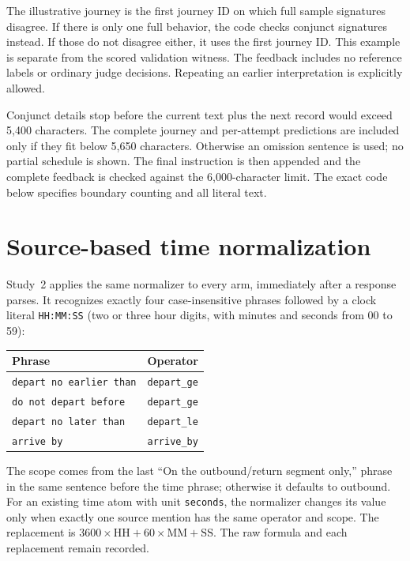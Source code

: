 \documentclass[11pt,a4paper]{scrartcl}
\newcommand{\codefile}[1]{\VerbatimInput[fontsize=\small,breaklines=true,breakanywhere=true]{reproducibility/#1}}
\begin{document}
The illustrative journey is the first journey ID on which full sample signatures disagree. If there is only one full behavior, the code checks conjunct signatures instead. If those do not disagree either, it uses the first journey ID. This example is separate from the scored validation witness. The feedback includes no reference labels or ordinary judge decisions. Repeating an earlier interpretation is explicitly allowed.

Conjunct details stop before the current text plus the next record would exceed 5,400 characters. The complete journey and per-attempt predictions are included only if they fit below 5,650 characters. Otherwise an omission sentence is used; no partial schedule is shown. The final instruction is then appended and the complete feedback is checked against the 6,000-character limit. The exact code below specifies boundary counting and all literal text.
\codefile{feedback.py.txt}

\section{Source-based time normalization}
Study~2 applies the same normalizer to every arm, immediately after a response parses. It recognizes exactly four case-insensitive phrases followed by a clock literal \texttt{HH:MM:SS} (two or three hour digits, with minutes and seconds from 00 to 59):
\begin{center}
\begin{tabular}{ll}
\toprule
Phrase & Operator \\
\midrule
\texttt{depart no earlier than} & \texttt{depart\_ge} \\
\texttt{do not depart before} & \texttt{depart\_ge} \\
\texttt{depart no later than} & \texttt{depart\_le} \\
\texttt{arrive by} & \texttt{arrive\_by} \\
\bottomrule
\end{tabular}
\end{center}
The scope comes from the last ``On the outbound/return segment only,'' phrase in the same sentence before the time phrase; otherwise it defaults to outbound. For an existing time atom with unit \texttt{seconds}, the normalizer changes its value only when exactly one source mention has the same operator and scope. The replacement is $3600\times\mathrm{HH}+60\times\mathrm{MM}+\mathrm{SS}$. The raw formula and each replacement remain recorded.
\end{document}
